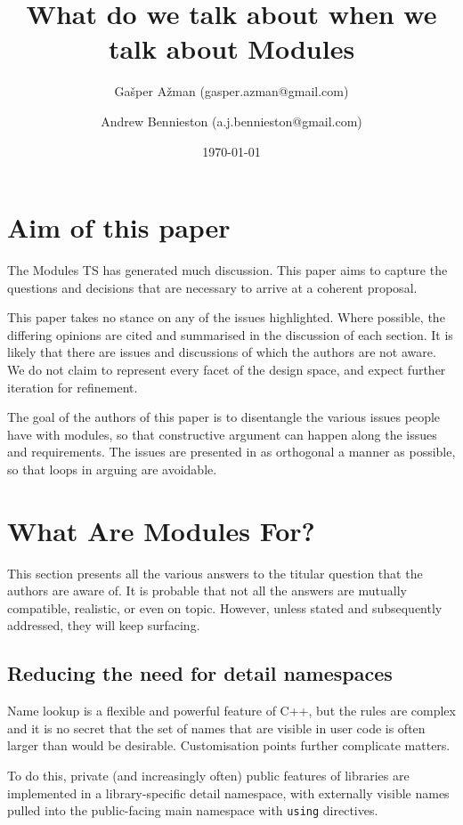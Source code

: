 \documentclass[reqno]{article}
\title{What do we talk about when we talk about Modules}
\author{Gašper Ažman \small{(gasper.azman@gmail.com)}
\and Andrew Bennieston \small{(a.j.bennieston@gmail.com)}}
\date{\today}
\begin{document}
\maketitle
\section{Aim of this paper}

The Modules TS \citep{N4647} has generated much discussion. This paper aims to
capture the questions and decisions that are necessary to arrive at a coherent
proposal.

This paper takes no stance on any of the issues highlighted. Where possible,
the differing opinions are cited and summarised in the discussion of each
section. It is likely that there are issues and discussions of which the
authors are not aware. We do not claim to represent every facet of the design
space, and expect further iteration for refinement.

The goal of the authors of this paper is to disentangle the various issues
people have with modules, so that constructive argument can happen along the
issues and requirements. The issues are presented in as orthogonal a manner as
possible, so that loops in arguing are avoidable.


\section{What Are Modules For?}

This section presents all the various answers to the titular question that the
authors are aware of. It is probable that not all the answers are mutually
compatible, realistic, or even on topic. However, unless stated and
subsequently addressed, they will keep surfacing.


\subsection{Reducing the need for detail namespaces}

Name lookup is a flexible and powerful feature of C++, but the rules are
complex and it is no secret that the set of names that are visible in user code
is often larger than would be desirable. Customisation points further
complicate matters.

To do this, private (and increasingly often) public features of libraries are
implemented in a library-specific detail namespace, with externally visible
names pulled into the public-facing main namespace with \texttt{using}
directives.
\end{document}
